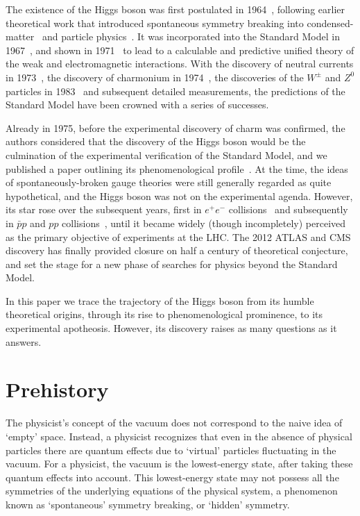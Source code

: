 \documentclass[12pt]{article}
\numberwithin{equation}{section}
\begin{document}
The existence of the Higgs boson was first postulated in
1964~\cite{H2}, following earlier theoretical work that introduced
spontaneous symmetry breaking into condensed-matter~\cite{Anderson}
and particle physics~\cite{Nambu,EB,H1}. It was incorporated into the
Standard Model in 1967~\cite{Weinberg,Salam}, and shown in
1971~\cite{tHV} to lead to a calculable and predictive unified theory
of the weak and electromagnetic interactions. With
the discovery of neutral currents in 1973~\cite{NC}, the discovery
of charmonium in 1974~\cite{Jpsi}, the discoveries of the $W^\pm$ and
$Z^0$ particles in 1983~\cite{WZ} and subsequent detailed measurements, the predictions of the Standard Model have
been crowned with a series of successes.

Already in 1975, before the experimental discovery of charm was
confirmed, the authors considered that the discovery of the Higgs boson would
be the culmination of the experimental verification of the Standard
Model, and we published a paper outlining its phenomenological
profile~\cite{EGN}. At the time, the ideas of spontaneously-broken
gauge theories were still generally regarded as quite hypothetical,
and the Higgs boson was not on the
experimental agenda. However, its star rose over the subsequent years,
first in $e^+ e^-$ collisions~\cite{EG76} and subsequently in ${\bar
  p} p$ and $pp$ collisions~\cite{GGMN,GNY}, until it became widely
(though incompletely) perceived as the primary objective of
experiments at the LHC.  The 2012 ATLAS and CMS discovery has finally
provided closure on half a century of theoretical conjecture,
and set the stage for a new phase of searches for physics
beyond the Standard Model.

In this paper we trace the trajectory of the Higgs boson from its
humble theoretical origins, through its rise to phenomenological
prominence, to its experimental apotheosis. However, its discovery
raises as many questions as it answers.

\section{Prehistory}

The physicist's concept of the vacuum does not correspond to the naive idea of
`empty' space. Instead, a physicist recognizes that even in the absence of physical 
particles there are quantum effects due to `virtual' particles
fluctuating in the vacuum. For a physicist, the vacuum
is the lowest-energy state, after taking these quantum effects into account. This
lowest-energy state may not possess all the symmetries of the underlying equations
of the physical system, a phenomenon known as `spontaneous' symmetry breaking,
or `hidden' symmetry.
\end{document}
